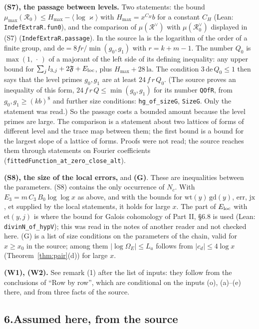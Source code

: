 \documentclass[11pt,letterpaper]{article}
\begin{document}
\textbf{(S7), the passage between levels.} Two statements: the bound
$\mu_{\max}(\mathcal R_0)\le H_{\max}-\langle\log\varkappa\rangle$ with $H_{\max}=x^{C_H}b$ for a
constant $C_H$ (Lean: \texttt{IndefExtraR.fun0}), and the comparison of $\mu(\mathcal R^\vee)$ with
$\mu(\mathcal R_0^\vee)$ displayed in (S7) (\texttt{IndefExtraR.passage}). In the source $\mathrm{la}$ is
the logarithm of the order of a finite group, and $\mathrm{de}=8fr/\min(g_0,g_1)$ with $r=k+m-1$. The
number $Q_0$ is $\max(1,\,\cdot\,)$ of a majorant of the left side of its defining inequality: any upper
bound for $\sum_jl_{3,j}+2\mathfrak F+E_{\rm loc}$, plus $H_{\max}+28\,\mathrm{la}$. The condition
$3\,\mathrm{de}\,Q_0\le1$ then says that the level primes $g_0,g_1$ are at least $24\,f\,r\,Q_0$. (The
source proves an inequality of this form, $24\,f\,r\,Q\le\min(g_0,g_1)$ for its number \texttt{QOfR}, from
$g_0,g_1\ge(kb)^8$ and further size conditions: \texttt{hg\_of\_sizeG}, \texttt{SizeG}. Only the statement was read.) So the
passage costs a bounded amount because the level primes are large. The comparison is a statement about
two lattices of forms of different level and the trace map between them; the first bound is a bound for
the largest slope of a lattice of forms. Proofs were not read; the source reaches them through
statements on Fourier coefficients (\texttt{fittedFunction\_at\_zero\_close\_alt}).

\textbf{(S8), the size of the local errors,} and \textbf{(G)}. These are inequalities between the
parameters. (S8) contains the only occurrence of $N_c$. With $E_3=m\,C_3\,B_0\log\log x$ as above, and
with the bounds for $\mathrm{wt}(y)\,\mathrm{gd}(y)$, $\mathrm{err}$, $\mathrm{jx}$, $\mathrm{et}$
supplied by the local statements, it holds for large $x$. The part of $E_{\rm loc}$ with
$\mathrm{et}(y,j)$ is where the bound for Galois cohomology of Part II, \S6.8 is used (Lean:
\texttt{divinN\_of\_hypV}); this was read in the notes of another reader and not checked here. (G) is a
list of size conditions on the parameters of the chain, valid for $x\ge x_0$ in the source; among them
$|\log\Omega_E|\le L_a$ follows from $|c_d|\le4\log x$ (Theorem~\ref{thm:pair}(d)) for large $x$.

\textbf{(W1), (W2).} See remark (1) after the list of inputs: they follow from the conclusions of ``Row
by row'', which are conditional on the inputs (o), (a)--(e) there, and from three facts of the source.

\subsection*{6.\quad Assumed here, from the source}
\end{document}
